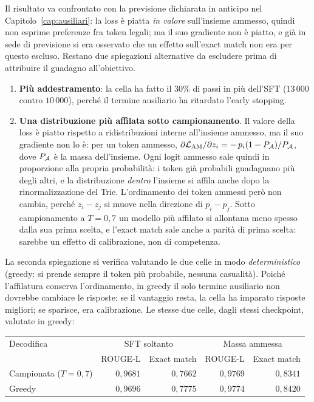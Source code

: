 Il risultato va confrontato con la previsione dichiarata in anticipo nel
Capitolo~\ref{cap:ausiliari}: la loss è piatta \emph{in valore} sull'insieme
ammesso, quindi non esprime preferenze fra token legali; ma il suo gradiente non
è piatto, e già in sede di previsione si era osservato che un effetto sull'exact
match non era per questo escluso. Restano due spiegazioni alternative da
escludere prima di attribuire il guadagno all'obiettivo.

\begin{enumerate}
  \item \textbf{Più addestramento}: la cella ha fatto il $30\%$ di passi in più
        dell'SFT ($13\,000$ contro $10\,000$), perché il termine ausiliario ha
        ritardato l'early stopping.
  \item \textbf{Una distribuzione più affilata sotto campionamento}. Il valore
        della loss è piatto rispetto a ridistribuzioni interne all'insieme
        ammesso, ma il suo gradiente non lo è: per un token ammesso,
        $\partial \mathcal{L}_{\text{AM}} / \partial z_i
        = -\,p_i (1 - P_{\mathcal{A}}) / P_{\mathcal{A}}$, dove $P_{\mathcal{A}}$ è la
        massa dell'insieme. Ogni logit ammesso sale quindi in proporzione alla
        propria probabilità: i token già probabili guadagnano più degli altri,
        e la distribuzione \emph{dentro} l'insieme si affila anche dopo la
        rinormalizzazione del Trie. L'ordinamento dei token ammessi però non
        cambia, perché $z_i - z_j$ si muove nella direzione di $p_i - p_j$.
        Sotto campionamento a $T = 0{,}7$ un modello più affilato si allontana
        meno spesso dalla sua prima scelta, e l'exact match sale anche a parità
        di prima scelta: sarebbe un effetto di calibrazione, non di competenza.
\end{enumerate}

La seconda spiegazione si verifica valutando le due celle in modo
\emph{deterministico} (greedy: si prende sempre il token più probabile, nessuna
casualità). Poiché l'affilatura conserva l'ordinamento, in greedy il solo termine
ausiliario non dovrebbe cambiare le risposte: se il vantaggio resta, la cella ha
imparato risposte migliori; se sparisce, era calibrazione. Le stesse due celle,
dagli stessi checkpoint, valutate in greedy:

\begin{center}
\begin{tabular}{lrrrr}
\toprule
Decodifica & \multicolumn{2}{c}{SFT soltanto} & \multicolumn{2}{c}{Massa ammessa} \\
 & ROUGE-L & Exact match & ROUGE-L & Exact match \\
\midrule
Campionata ($T=0{,}7$) & $0{,}9681$ & $0{,}7662$ & $0{,}9769$ & $0{,}8341$ \\
Greedy & $0{,}9696$ & $0{,}7775$ & $0{,}9774$ & $0{,}8420$ \\
\bottomrule
\end{tabular}
\end{center}

